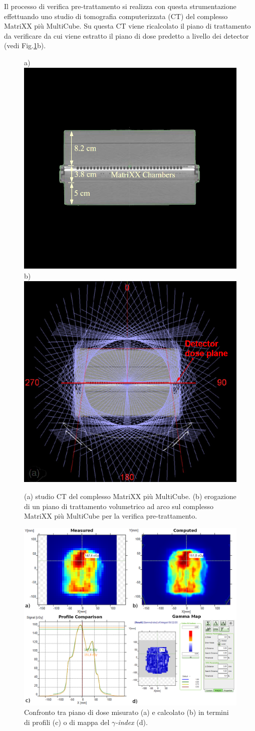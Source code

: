 Il processo di verifica pre-trattamento si realizza con questa strumentazione effettuando uno studio di tomografia computerizzata (CT) del complesso MatriXX più MultiCube. Su questa CT viene ricalcolato il piano di trattamento da verificare da cui viene estratto il piano di dose predetto a livello dei detector (vedi Fig.\ref{fig:MatriXX_CT}b).
\begin{figure}
\centering
a)\includegraphics[width=.43\textwidth]{./cap2/MatriXX_CT.png}
b)\includegraphics[width=.43\textwidth]{./cap2/MatriXX_CT_Plan.png}
\caption{(a) studio CT del complesso MatriXX più MultiCube. (b) erogazione di un piano di trattamento volumetrico ad arco sul complesso MatriXX più MultiCube per la verifica pre-trattamento.}
\label{fig:MatriXX_CT}
\end{figure}
\begin{figure}
\centering
\includegraphics[width=\textwidth]{./cap2/gamma_comparison.png}
\caption{Confronto tra piano di dose misurato (a) e calcolato (b) in termini di profili (c) o di mappa del $\gamma$\textit{-index} (d).}
\label{fig:gamma_comparison}
\end{figure}

